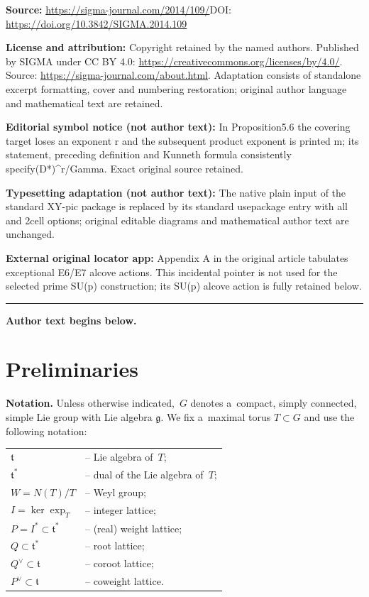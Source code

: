 \documentclass[11pt]{article}
\numberwithin{equation}{section}
\begin{document}
\noindent\textbf{Source:} \url{https://sigma-journal.com/2014/109/}\quad DOI: \url{https://doi.org/10.3842/SIGMA.2014.109}\par
\noindent\textbf{License and attribution:} Copyright retained by the named authors. Published by SIGMA under CC BY 4.0: \url{https://creativecommons.org/licenses/by/4.0/}. Source: \url{https://sigma-journal.com/about.html}. Adaptation consists of standalone excerpt formatting, cover and numbering restoration; original author language and mathematical text are retained.\par
\noindent\textbf{Editorial symbol notice (not author text):} In Proposition5.6 the covering target loses an exponent r and the subsequent product exponent is printed m; its statement, preceding definition and Kunneth formula consistently specify(D*\allowbreak{})\textasciicircum{}r/Gamma. Exact original source retained.\par
\noindent\textbf{Typesetting adaptation (not author text):} The native plain input of the standard XY-pic package is replaced by its standard usepackage entry with all and 2cell options; original editable diagrams and mathematical author text are unchanged.\par
\noindent\textbf{External original locator app:} Appendix A in the original article tabulates exceptional E6/E7 alcove actions. This incidental pointer is not used for the selected prime SU(p) construction; its SU(p) alcove action is fully retained below.\par
\medskip\hrule\medskip\noindent\textbf{Author text begins below.}\par
\setcounter{section}{1}
\setcounter{subsection}{0}
\setcounter{subsubsection}{0}
\setcounter{Theorem}{0}
\setcounter{equation}{0}
\section{Preliminaries}

{\bf Notation.}
Unless otherwise indicated,~$G$ denotes a~compact, simply connected, simple Lie group with Lie algebra $\mathfrak{g}$.
We f\/ix a~maximal torus $T\subset G$ and use the following notation:

\begin{tabular}{l@{\,\,}l} $\mathfrak{t}$ & -- Lie algebra of~$T$;
\\
$\mathfrak{t}^*$ & -- dual of the Lie algebra of~$T$;
\\
$W=N(T)/T$ & -- Weyl group;
\\
$I= \ker \exp_T$ & -- integer lattice;
\\
$P =I^*\subset \mathfrak{t}^*$ & -- (real) weight lattice;
\\
$Q \subset \mathfrak{t}^*$ & -- root lattice;
\\
$Q^\vee\subset \mathfrak{t}$ & -- coroot lattice;
\\
$P^\vee \subset \mathfrak{t}$ & -- coweight lattice.
\end{tabular}
\end{document}
